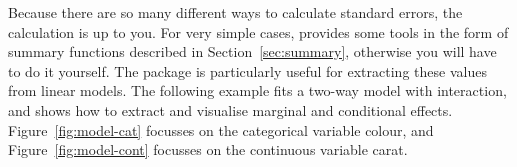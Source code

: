Because there are so many different ways to calculate standard errors, the calculation is up to you.  For very simple cases, \ggplot provides some tools in the form of summary functions described in Section~\ref{sec:summary}, otherwise you will have to do it yourself.  The  package \citep{effects} is particularly useful for extracting these values from linear models.  The following example fits a two-way model with interaction, and shows how to extract and visualise marginal and conditional effects.  Figure~\ref{fig:model-cat} focusses on the categorical variable colour, and Figure~\ref{fig:model-cont} focusses on the continuous variable carat. 

% 
% 
% 
%
% 


% 


% 


